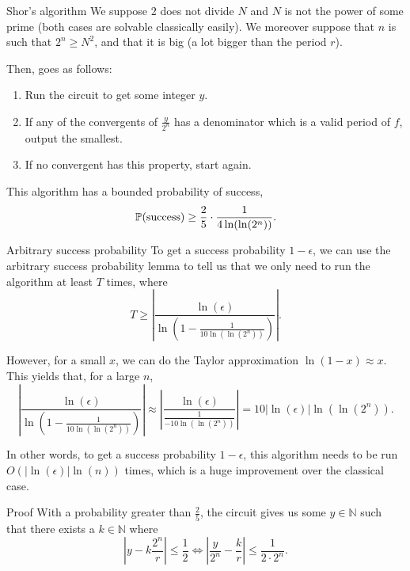 \documentclass[a4paper]{article}
\begin{document}
\begin{parag}{Shor's algorithm}
    We suppose $2$ does not divide $N$ and $N$ is not the power of some prime (both cases are solvable classically easily). We moreover suppose that $n$ is such that $2^n \geq N^2$, and that it is big (a lot bigger than the period $r$).

    Then,  goes as follows: 
    \begin{enumerate}
        \item Run the circuit to get some integer $y$.
        \item If any of the convergents of $\frac{y}{2^n}$ has a denominator which is a valid period of $f$, output the smallest. 
        \item If no convergent has this property, start again.
    \end{enumerate}

    This algorithm has a bounded probability of success,
    \[\prob\left(\text{success}\right) \geq \frac{2}{5} \cdot  \frac{1}{4 \ln\left(\ln\left(2^n\right)\right)}.\]
    
    \begin{subparag}{Arbitrary success probability}
        To get a success probability $1 - \epsilon$, we can use the arbitrary success probability lemma to tell us that we only need to run the algorithm at least $T$ times, where 
        \[T \geq \left|\frac{\ln\left(\epsilon\right)}{\ln\left(1 - \frac{1}{10 \ln\left(\ln\left(2^n\right)\right)}\right)}\right|.\]

        However, for a small $x$, we can do the Taylor approximation $\ln\left(1 - x\right) \approx x$. This yields that, for a large $n$,
        \[\left|\frac{\ln\left(\epsilon\right)}{\ln\left(1 - \frac{1}{10 \ln\left(\ln\left(2^n\right)\right)}\right)}\right| \approx \left|\frac{\ln\left(\epsilon\right)}{\frac{1}{-10 \ln\left(\ln\left(2^n\right)\right)}}\right| = 10 \left|\ln\left(\epsilon\right)\right| \ln\left(\ln\left(2^n\right)\right).\]
        
        In other words, to get a success probability $1 - \epsilon$, this algorithm needs to be run $O\left(\left|\ln\left(\epsilon\right)\right| \ln\left(n\right)\right)$ times, which is a huge improvement over the classical case.
    \end{subparag}

    \begin{subparag}{Proof}
        With a probability greater than $\frac{2}{5}$, the circuit gives us some $y \in \mathbb{N}$ such that there exists a $k \in \mathbb{N}$ where
        \[\left|y - k\frac{2^n}{r}\right| \leq \frac{1}{2} \iff \left|\frac{y}{2^n} - \frac{k}{r}\right| \leq \frac{1}{2\cdot 2^n}.\]


\end{subparag}
\end{parag}
\end{document}
